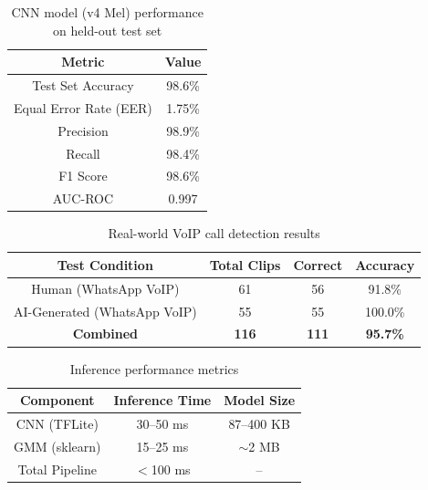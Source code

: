\documentclass[12pt,a4paper,titlepage]{report}
\begin{document}
	\begin{table}[H]
		\begin{center}
			\begin{tabular}{|c|c|}
				\hline
				\textbf{Metric} & \textbf{Value} \\
				\hline
				Test Set Accuracy & 98.6\% \\
				\hline
				Equal Error Rate (EER) & 1.75\% \\
				\hline
				Precision & 98.9\% \\
				\hline
				Recall & 98.4\% \\
				\hline
				F1 Score & 98.6\% \\
				\hline
				AUC-ROC & 0.997 \\
				\hline
			\end{tabular}
			\caption{CNN model (v4 Mel) performance on held-out test set}
		\end{center}
	\end{table}
	
	\begin{table}[H]
		\begin{center}
			\begin{tabular}{|c|c|c|c|}
				\hline
				\textbf{Test Condition} & \textbf{Total Clips} & \textbf{Correct} & \textbf{Accuracy} \\
				\hline
				Human (WhatsApp VoIP) & 61 & 56 & 91.8\% \\
				\hline
				AI-Generated (WhatsApp VoIP) & 55 & 55 & 100.0\% \\
				\hline
				\textbf{Combined} & \textbf{116} & \textbf{111} & \textbf{95.7\%} \\
				\hline
			\end{tabular}
			\caption{Real-world VoIP call detection results}
		\end{center}
	\end{table}
	
	\begin{table}[H]
		\begin{center}
			\begin{tabular}{|c|c|c|}
				\hline
				\textbf{Component} & \textbf{Inference Time} & \textbf{Model Size} \\
				\hline
				CNN (TFLite) & 30--50 ms & 87--400 KB \\
				\hline
				GMM (sklearn) & 15--25 ms & $\sim$2 MB \\
				\hline
				Total Pipeline & $<$100 ms & -- \\
				\hline
			\end{tabular}
			\caption{Inference performance metrics}
		\end{center}
	\end{table}
	
\end{document}
